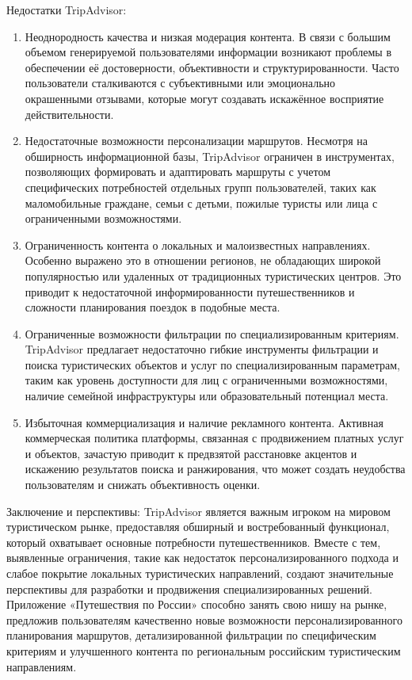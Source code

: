 Недостатки TripAdvisor:
\begin{enumerate}
    \item Неоднородность качества и низкая модерация контента. В связи с большим объемом генерируемой пользователями информации возникают проблемы в обеспечении её достоверности, объективности и структурированности. Часто пользователи сталкиваются с субъективными или эмоционально окрашенными отзывами, которые могут создавать искажённое восприятие действительности.
    \item Недостаточные возможности персонализации маршрутов. Несмотря на обширность информационной базы, TripAdvisor ограничен в инструментах, позволяющих формировать и адаптировать маршруты с учетом специфических потребностей отдельных групп пользователей, таких как маломобильные граждане, семьи с детьми, пожилые туристы или лица с ограниченными возможностями.
    \item Ограниченность контента о локальных и малоизвестных направлениях. Особенно выражено это в отношении регионов, не обладающих широкой популярностью или удаленных от традиционных туристических центров. Это приводит к недостаточной информированности путешественников и сложности планирования поездок в подобные места.
    \item Ограниченные возможности фильтрации по специализированным критериям. TripAdvisor предлагает недостаточно гибкие инструменты фильтрации и поиска туристических объектов и услуг по специализированным параметрам, таким как уровень доступности для лиц с ограниченными возможностями, наличие семейной инфраструктуры или образовательный потенциал места.
    \item Избыточная коммерциализация и наличие рекламного контента. Активная коммерческая политика платформы, связанная с продвижением платных услуг и объектов, зачастую приводит к предвзятой расстановке акцентов и искажению результатов поиска и ранжирования, что может создать неудобства пользователям и снижать объективность оценки.
\end{enumerate}

Заключение и перспективы:
TripAdvisor является важным игроком на мировом туристическом рынке, предоставляя обширный и востребованный функционал, который охватывает основные потребности путешественников. Вместе с тем, выявленные ограничения, такие как недостаток персонализированного подхода и слабое покрытие локальных туристических направлений, создают значительные перспективы для разработки и продвижения специализированных решений. Приложение «Путешествия по России» способно занять свою нишу на рынке, предложив пользователям качественно новые возможности персонализированного планирования маршрутов, детализированной фильтрации по специфическим критериям и улучшенного контента по региональным российским туристическим направлениям.

